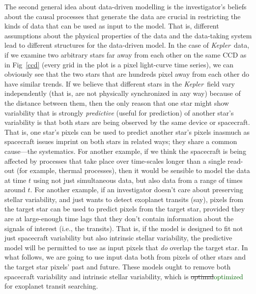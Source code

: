 \documentclass[12pt, preprint]{aastex}
\newcommand{\project}[1]{\textsl{#1}}
\newcommand{\Kepler}{\project{Kepler}}
\newcommand{\revise}[1]{\textcolor{darkgreen}{#1}}
\newcommand{\remove}[1]{\sout{#1}}
\begin{document}
The second general idea about data-driven modelling is the investigator's beliefs about the causal processes that generate the data are crucial in restricting the kinds of data that can be used as input to the model.
That is, different assumptions about the physical properties of the data and the data-taking system lead to different structures for the data-driven model.
In the case of \Kepler\ data, 
  if we examine two arbitrary stars far away from each other 
  on the same CCD as in Fig~\ref{ccd} (every grid in the plot is a pixel light-curve time series), 
  we can obviously see that the two stars that are hundreds pixel away from each other do have similar trends. 
  If we believe that different stars in the \Kepler\ field vary independently 
  (that is, are not physically synchronized in any way) because of the distance between them, 
  then the only reason that one star might show variability that is strongly \emph{predictive} (useful for prediction) of another star's variability
  is that both stars are being observed by the same device or spacecraft.
That is, one star's pixels can be used to predict another star's pixels inasmuch as spacecraft issues imprint on both stars in related ways;
  they share a common cause---the systematics.  
For another example, if we think the spacecraft is being affected by
  processes that take place over time-scales longer than a single read-out
  (for example, thermal processes),
  then it would be sensible to model the data at time $t$ using not just simultaneous data, but also data from a range of times around $t$.
For another example, if an investigator doesn't care about preserving stellar variability,
  and just wants to detect exoplanet transits (say),
  pixels from the target star can be used to predict pixels from the target star,
  provided they are at large-enough time lags that they don't contain information about
  the signals of interest (i.e., the transits).
That is, if the model is designed to fit not just spacecraft variability
  but also intrinsic stellar variability,
  the predictive model will be permitted to use as input pixels that \emph{do} overlap the target star.
In what follows, we are going to use input data both from pixels of other stars and the target star pixels' past and future.
These models ought to remove both spacecraft variability and intrinsic stellar variability, which is \remove{optimal}\revise{optimized} for exoplanet transit searching.
\end{document}
